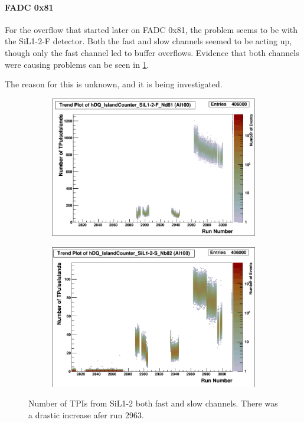 \documentclass[a4paper]{article}
\begin{document}
\paragraph{FADC 0x81}
For the overflow that started later on FADC 0x81, the problem seems to be with the SiL1-2-F
detector. Both the fast and slow channels seemed to be acting up, though only the fast channel
led to buffer overflows. Evidence that both channels were causing problems can be seen
in \ref{fig:al100_sil12_n}.

The reason for this is unknown, and it is being investigated.


\begin{figure}
  \begin{subfigure}{0.5\textwidth}
    \includegraphics[width=0.9\linewidth]{figs/al100/sil12f_n}
  \end{subfigure}%
  \begin{subfigure}{0.5\textwidth}
    \includegraphics[width=0.9\linewidth]{figs/al100/sil12s_n}
  \end{subfigure}
  \caption{Number of TPIs from SiL1-2 both fast and slow channels. There
    was a drastic increase afer run 2963.}
  \label{fig:al100_sil12_n}
\end{figure}
\end{document}
